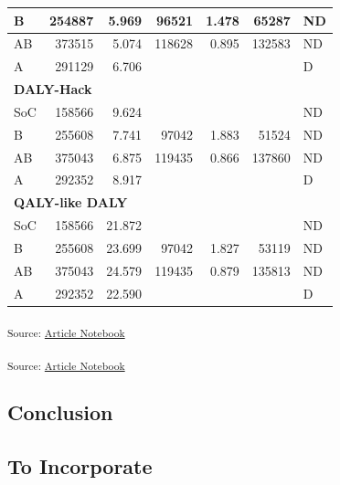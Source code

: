 \documentclass[
]{agujournal2019}
\begin{document}
\begin{table}
\begin{tabular}{l|r|r|r|r|r|l}
\hline
\hspace{1em}B & 254887 & 5.969 & 96521 & 1.478 & 65287 & ND\\
\hline
\hspace{1em}AB & 373515 & 5.074 & 118628 & 0.895 & 132583 & ND\\
\hline
\hspace{1em}A & 291129 & 6.706 &  &  &  & D\\
\hline
\multicolumn{7}{l}{\textbf{DALY-Hack}}\\
\hline
\hspace{1em}SoC & 158566 & 9.624 &  &  &  & ND\\
\hline
\hspace{1em}B & 255608 & 7.741 & 97042 & 1.883 & 51524 & ND\\
\hline
\hspace{1em}AB & 375043 & 6.875 & 119435 & 0.866 & 137860 & ND\\
\hline
\hspace{1em}A & 292352 & 8.917 &  &  &  & D\\
\hline
\multicolumn{7}{l}{\textbf{QALY-like DALY}}\\
\hline
\hspace{1em}SoC & 158566 & 21.872 &  &  &  & ND\\
\hline
\hspace{1em}B & 255608 & 23.699 & 97042 & 1.827 & 53119 & ND\\
\hline
\hspace{1em}AB & 375043 & 24.579 & 119435 & 0.879 & 135813 & ND\\
\hline
\hspace{1em}A & 292352 & 22.590 &  &  &  & D\\
\hline
\end{tabular}
\end{table}

\textsubscript{Source:
\href{https://graveja0.github.io/dalys/index.qmd.html}{Article
Notebook}}

\textsubscript{Source:
\href{https://graveja0.github.io/dalys/index.qmd.html}{Article
Notebook}}

\subsection{Conclusion}\label{conclusion}

\subsection{To Incorporate}\label{to-incorporate}
\end{document}
